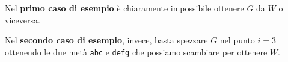 

\Examples
\begin{example}
%
%
\end{example}


\Explanation
Nel \textbf{primo caso di esempio} è chiaramente impossibile ottenere $G$ da $W$ o viceversa.

Nel \textbf{secondo caso di esempio}, invece, basta spezzare $G$ nel punto $i = 3$ ottenendo le due metà \texttt{abc} e \texttt{defg} che possiamo scambiare per ottenere $W$.
